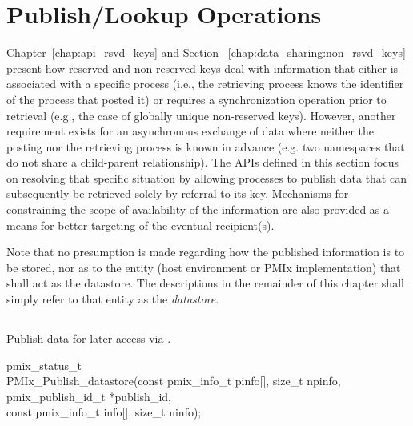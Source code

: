 \chapter{Publish/Lookup Operations}
\label{chap:pub}

Chapter~\ref{chap:api_rsvd_keys}
and
Section ~\ref{chap:data_sharing:non_rsvd_keys}
present how reserved and non-reserved keys deal with
information that either is associated with a specific process (i.e., the
retrieving process knows the identifier of the process that posted it) or
requires a synchronization operation prior to retrieval (e.g., the case of
globally unique non-reserved keys). However, another requirement exists for an
asynchronous exchange of data where neither the posting nor the retrieving
process is known in advance (e.g. two namespaces that do not share a child-parent relationship).
The \acp{API} defined in this section focus on resolving that specific
situation by allowing processes to publish data that can subsequently be
retrieved solely by referral to its key. Mechanisms for constraining
the scope of availability of the information are also provided as a means for better
targeting of the eventual recipient(s).

Note that no presumption is made regarding how the published information is to be stored, nor as to the entity (host environment or \ac{PMIx} implementation) that shall act as the datastore. The descriptions in the remainder of this chapter shall simply refer to that entity as the \emph{datastore}.

\section{}


\summary

Publish data for later access via .

\format


\cspecificstart
\begin{codepar}
pmix_status_t \\
PMIx_Publish_datastore(const pmix_info_t pinfo[], size_t npinfo, \\
\hspace*{12\sigspace}pmix_publish_id_t *publish_id, \\
\hspace*{12\sigspace}const pmix_info_t info[], size_t ninfo);
\end{codepar}
\cspecificend


